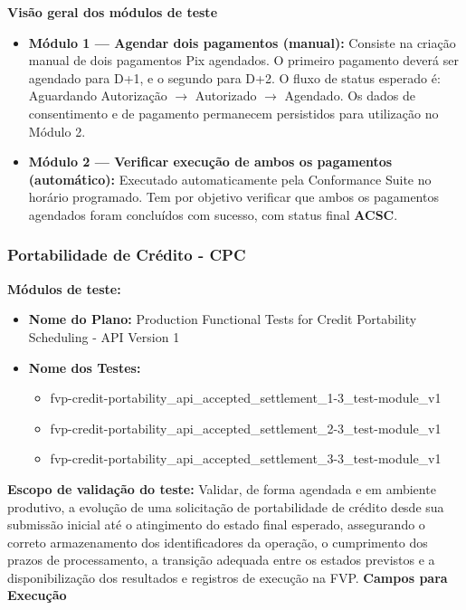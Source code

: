 \textbf{Visão geral dos módulos de teste}

\begin{itemize}
    \item \textbf{Módulo 1 — Agendar dois pagamentos (manual):} Consiste na criação manual de dois pagamentos Pix agendados. O primeiro pagamento deverá ser agendado para D+1, e o segundo para D+2. O fluxo de status esperado é: Aguardando Autorização $\rightarrow$ Autorizado $\rightarrow$ Agendado. Os dados de consentimento e de pagamento permanecem persistidos para utilização no Módulo 2.
    
    \item \textbf{Módulo 2 — Verificar execução de ambos os pagamentos (automático):} Executado automaticamente pela Conformance Suite no horário programado. Tem por objetivo verificar que ambos os pagamentos agendados foram concluídos com sucesso, com status final \textbf{ACSC}.
\end{itemize}

\subsubsection{Portabilidade de Crédito - CPC}

\textbf{Módulos de teste:}

\begin{itemize}
    \item \textbf{Nome do Plano: }Production Functional Tests for Credit Portability Scheduling - API Version 1
    \item \textbf{Nome dos Testes:}
    \begin{itemize}
        \item fvp-credit-portability\_api\_accepted\_settlement\_1-3\_test-module\_v1
        \item fvp-credit-portability\_api\_accepted\_settlement\_2-3\_test-module\_v1
        \item fvp-credit-portability\_api\_accepted\_settlement\_3-3\_test-module\_v1
    \end{itemize}
\end{itemize}
\medskip
\textbf{Escopo de validação do teste:}
\medskip
Validar, de forma agendada e em ambiente produtivo, a evolução de uma solicitação de portabilidade de crédito desde sua submissão inicial até o atingimento do estado final esperado, assegurando o correto armazenamento dos identificadores da operação, o cumprimento dos prazos de processamento, a transição adequada entre os estados previstos e a disponibilização dos resultados e registros de execução na FVP.
\medskip
\textbf{Campos para Execução}

